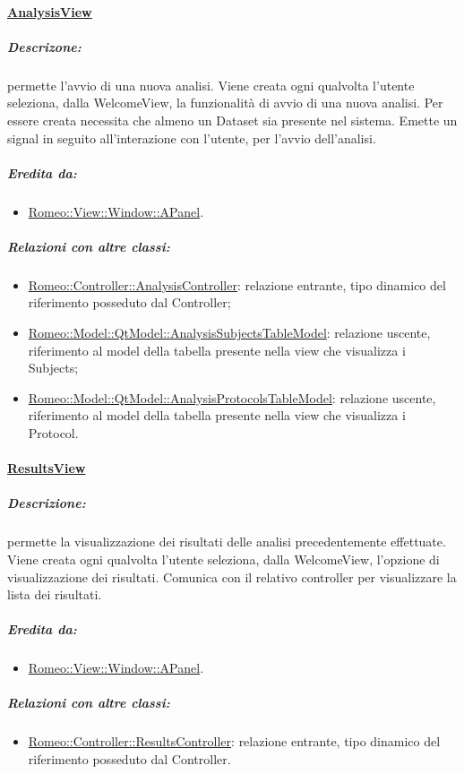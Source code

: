 	\paragraph{\underline{AnalysisView}}
	\label{sav} 
		\subparagraph{Descrizone:} permette l'avvio di una nuova analisi. Viene creata ogni qualvolta l'utente seleziona, dalla WelcomeView, la funzionalità di avvio di una nuova analisi. Per essere creata necessita che almeno un Dataset\g{} sia presente nel sistema. Emette un signal\g{} in seguito all'interazione con l'utente, per l'avvio dell'analisi.
		\subparagraph{Eredita da:}
			\begin{itemize}
				\item \hyperref[ab_panel]{Romeo::View::Window::APanel}.
			\end{itemize}
		\subparagraph{Relazioni con altre classi:}
			\begin{itemize}
				\item \hyperref[controller_sa]{Romeo::Controller::AnalysisController}: relazione entrante, tipo dinamico del riferimento posseduto dal Controller;
				\item \hyperref[controller_tm]{Romeo::Model::QtModel::AnalysisSubjectsTableModel}: relazione uscente, riferimento al model della tabella presente nella view che visualizza i Subjects;
				\item \hyperref[controller_tm]{Romeo::Model::QtModel::AnalysisProtocolsTableModel}: relazione uscente, riferimento al model della tabella presente nella view che visualizza i Protocol.
			\end{itemize}
	
	\paragraph{\underline{ResultsView}}
	\label{vrv} 
		\subparagraph{Descrizione:} permette la visualizzazione dei risultati delle analisi precedentemente effettuate. Viene creata ogni qualvolta l'utente seleziona, dalla WelcomeView, l'opzione di visualizzazione dei risultati. Comunica con il relativo controller per visualizzare la lista dei risultati.
		\subparagraph{Eredita da:}
			\begin{itemize}
				\item \hyperref[ab_panel]{Romeo::View::Window::APanel}.
			\end{itemize}
		\subparagraph{Relazioni con altre classi:}
			\begin{itemize}
				\item \hyperref[controller_vr]{Romeo::Controller::ResultsController}: relazione entrante, tipo dinamico del riferimento posseduto dal Controller.
			\end{itemize}
	
